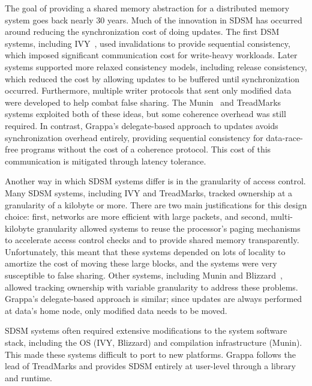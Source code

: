 \vspace{0.5ex}
The goal of providing a shared memory abstraction for a distributed
memory system goes back nearly 30 years. Much of the innovation in SDSM has occurred around reducing the
synchronization cost of doing updates. The first DSM systems,
including IVY~\cite{Li:1989:MCS:75104.75105}, used invalidations to
provide sequential consistency, which imposed significant
communication cost for write-heavy workloads.  Later systems supported
more relaxed consistency models, including release consistency, which
reduced the cost by allowing updates to be buffered until
synchronization occurred. Furthermore, multiple writer protocols that
sent only modified data were developed to help combat false
sharing. The
Munin~\cite{Bennett:1990:MDS:99163.99182,Carter:1991:IPM:121132.121159}
and TreadMarks~\cite{Keleher:1994:TDS:1267074.1267084} systems
exploited both of these ideas, but some coherence overhead was still
required. In contrast, Grappa's delegate-based approach to updates
avoids synchronization overhead entirely, providing sequential
consistency for data-race-free programs without the cost of a
coherence protocol. This cost of this communication is mitigated through latency
tolerance.


Another way in which SDSM systems differ is in the granularity of
access control. Many SDSM systems, including IVY and TreadMarks,
tracked ownership at a granularity of a kilobyte or more. There are
two main justifications for this design choice: first, networks are
more efficient with large packets, and second, multi-kilobyte
granularity allowed systems to reuse the processor's paging mechanisms
to accelerate access control checks and to provide shared memory
transparently. Unfortunately, this meant that these systems depended
on lots of locality to amortize the cost of moving these large
blocks, and the systems were very susceptible to false sharing. Other
systems, including Munin and
Blizzard~\cite{Schoinas:1994:FAC:195473.195575}, allowed tracking
ownership with variable granularity to address these problems.
Grappa's delegate-based approach is similar; since updates are always
performed at data's home node, only modified data needs to be moved.


SDSM systems often required extensive modifications to the system
software stack, including the OS (IVY, Blizzard) and compilation
infrastructure (Munin). This made these systems difficult to port to
new platforms. Grappa follows the lead of TreadMarks and provides
SDSM entirely at user-level through a library and runtime.

